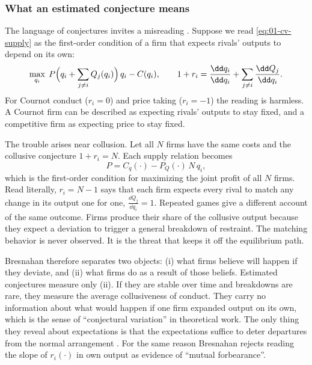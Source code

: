 \subsubsection{What an estimated conjecture means}\label{sec:01-cv-warning}

The language of conjectures invites a misreading \citep[pp.~1027--1029]{Bresnahan1989}. Suppose we read
\eqref{eq:01-cv-supply} as the first-order condition of a firm that expects rivals' outputs to depend on its own:
\begin{equation}\label{eq:01-cv-profit}
\max_{q_i}\; P\Bigl(q_i + \sum_{j \ne i} Q_j(q_i)\Bigr)\, q_i - C(q_i),
\qquad
1 + r_i = \frac{\dd q_i}{\dd q_i} + \sum_{j \ne i} \frac{\dd Q_j}{\dd q_i} .
\end{equation}
For Cournot conduct ($r_i = 0$) and price taking ($r_i = -1$) the reading is harmless. A Cournot firm can be described as
expecting rivals' outputs to stay fixed, and a competitive firm as expecting price to stay fixed.

The trouble arises near collusion. Let all $N$ firms have the same costs and the collusive conjecture $1 + r_i = N$.
Each supply relation becomes
\begin{equation}\label{eq:01-collusive-foc}
P = C_q(\cdot) - P_Q(\cdot)\, N\, q_i ,
\end{equation}
which is the first-order condition for maximizing the joint profit of all $N$ firms. Read literally, $r_i = N - 1$ says
that each firm expects every rival to match any change in its output one for one, $\frac{\dd Q_j}{\dd q_i} = 1$. Repeated
games give a different account of the same outcome. Firms produce their share of the collusive output because they expect
a deviation to trigger a general breakdown of restraint. The matching behavior is never observed. It is the threat that
keeps it off the equilibrium path.

Bresnahan therefore separates two objects: (i) what firms believe will happen if they deviate, and (ii) what firms do
as a result of those beliefs. Estimated conjectures measure only (ii). If they are stable over time and breakdowns are
rare, they measure the average collusiveness of conduct. They carry no information about what would happen if one
firm expanded output on its own, which is the sense of ``conjectural variation'' in theoretical work. The only thing
they reveal about expectations is that the expectations suffice to deter departures from the normal arrangement
\citep[fn.~19]{Bresnahan1989}. For the same reason Bresnahan rejects reading the slope of $r_i(\cdot)$ in own output as
evidence of ``mutual forbearance''.

